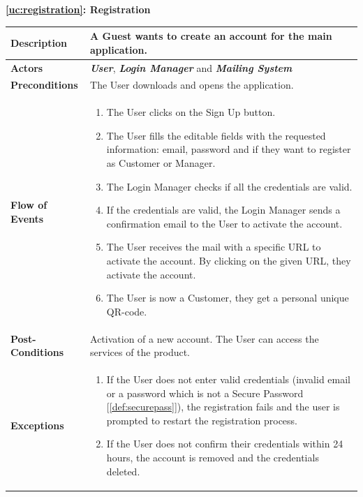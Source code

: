 \documentclass[a4paper, 12pt, oneside]{article}
\begin{document}
\begin{center}
{\textbf{\ref{uc:registration}: Registration}}
\end{center}
\begin{tabularx}{\linewidth}{| l | X |}
    
    \hline
    \textbf{Description} & A Guest wants to create an account for the main application.\\
    

    \hline
    \textbf{Actors} & \textbf{\textit{User}}, \textbf{\textit{Login Manager}} and \textbf{\textit{Mailing System}}\\
    
    \hline
    \textbf{Preconditions} & The User downloads and opens the application.\\
    
    \hline
    \textbf{Flow of Events} & \parbox{0.7\textwidth}{   
        \begin{enumerate}
            \item The User clicks on the Sign Up button.
            \item The User fills the editable fields with the requested information: email, password and if they want to register as Customer or Manager.
            \item The Login Manager checks if all the credentials are valid.
            \item If the credentials are valid, the Login Manager sends a confirmation email to the User to activate the account.
            \item The User receives the mail with a specific URL to activate the account. By clicking on the given URL, they activate the account.
            \item The User is now a Customer, they get a personal unique QR-code.
    \end{enumerate}}\\
    
    \hline
    \textbf{Post-Conditions} & Activation of a new account. The User can access the services of the product.\\
    
    \hline
    \textbf{Exceptions} & \parbox{0.7\textwidth}{ \begin{enumerate}
            \item If the User does not enter valid credentials (invalid email or a password which is not a Secure Password [\ref{def:securepass}]), the registration fails and the user is prompted to restart the registration process.
            \item If the User does not confirm their credentials within 24 hours, the account is removed and the credentials deleted.
        \end{enumerate}}\\

    \hline
    
\end{tabularx}
\end{document}
